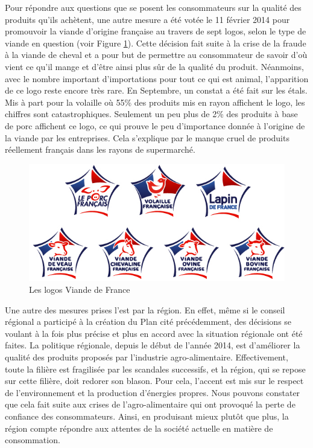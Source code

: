 \documentclass[a4paper,12pt]{report}
\begin{document}
			Pour répondre aux questions que se posent les consommateurs sur la qualité des produits qu’ils achètent, une autre mesure a été votée le 11 février 2014 pour promouvoir la viande d’origine française au travers de sept logos, selon le type de viande en question (voir Figure \ref{VDF}). Cette décision fait suite à la crise de la fraude à la viande de cheval et a pour but de permettre au consommateur de savoir d’où vient ce qu’il mange et d’être ainsi plus sûr de la qualité du produit. Néanmoins, avec le nombre important d’importations pour tout ce qui est animal, l’apparition de ce logo reste encore très rare. En Septembre, un constat a été fait sur les étals. Mis à part pour la volaille où 55\% des produits mis en rayon affichent le logo, les chiffres sont catastrophiques. Seulement un peu plus de 2\% des produits à base de porc affichent ce logo, ce qui prouve le peu d’importance donnée à l’origine de la viande par les entreprises\cite{FlopVDF}. Cela s'explique par le manque cruel de produits réellement français dans les rayons de supermarché.

			\begin{figure}[!h]
			\centering
			\includegraphics[scale=0.5]{Illustrations/VDF.jpg}
			\caption{Les logos Viande de France}
			\label{VDF}
			\end{figure}

			Une autre des mesures prises l’est par la région. En effet, même si le conseil régional a participé à la création du Plan cité précédemment, des décisions se voulant à la fois plus précise et plus en accord avec la situation régionale ont été faites. La politique régionale, depuis le début de l’année 2014, est d’améliorer la qualité des produits proposés par l’industrie agro-alimentaire\cite{FavoriserQualiteAgricultureagro-alimentaire}. Effectivement, toute la filière est fragilisée par les scandales successifs, et la région, qui se repose sur cette filière, doit redorer son blason. Pour cela, l’accent est mis sur le respect de l’environnement et la production d’énergies propres. Nous pouvons constater que cela fait suite aux crises de l’agro-alimentaire qui ont provoqué la perte de confiance des consommateurs. Ainsi, en produisant mieux plutôt que plus, la région compte répondre aux attentes de la société actuelle en matière de consommation.
\end{document}
